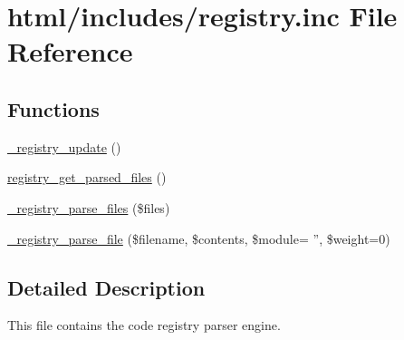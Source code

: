 \hypertarget{includes_2registry_8inc}{
\section{html/includes/registry.inc File Reference}
\label{includes_2registry_8inc}
}
\subsection*{Functions}
\begin{DoxyCompactItemize}
\item 
\hyperlink{group__registry_ga5008c77b133d55af7f1f4442d9e51167}{\_\-registry\_\-update} ()
\item 
\hyperlink{group__registry_ga072b32f340e117845791d7c6770da0f1}{registry\_\-get\_\-parsed\_\-files} ()
\item 
\hyperlink{group__registry_ga3b95761af0c42b685a2f1c4bc39b12d4}{\_\-registry\_\-parse\_\-files} (\$files)
\item 
\hyperlink{group__registry_ga9836752d4694599ffe4c393ff037fd44}{\_\-registry\_\-parse\_\-file} (\$filename, \$contents, \$module= '', \$weight=0)
\end{DoxyCompactItemize}


\subsection{Detailed Description}
This file contains the code registry parser engine. 